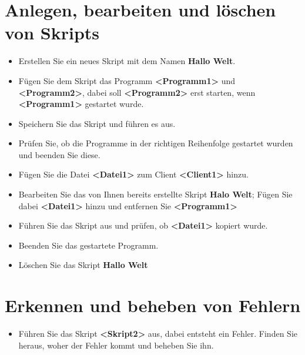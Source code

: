 \documentclass[accentcolor=tud1a,11pt]{tudexercise}
\begin{document}
\nutzerstudie
\section*{Anlegen, bearbeiten und löschen von Skripts}
\begin{itemize}
	\item Erstellen Sie ein neues Skript mit dem Namen \textbf{Hallo Welt}.
	\item Fügen Sie dem Skript das Programm \textbf{<Programm1>} und \textbf{<Programm2>}, dabei soll \textbf{<Programm2>} erst starten, wenn \textbf{<Programm1>} gestartet wurde.
	\item Speichern Sie das Skript und führen es aus.
	\item Prüfen Sie, ob die Programme in der richtigen Reihenfolge gestartet wurden und beenden Sie diese.
	\item Fügen Sie die Datei \textbf{<Datei1>} zum Client \textbf{<Client1>} hinzu.
	\item Bearbeiten Sie das von Ihnen bereits erstellte Skript \textbf{Halo Welt}; Fügen Sie dabei \textbf{<Datei1>} hinzu und entfernen Sie \textbf{<Programm1>}
	\item Führen Sie das Skript aus und prüfen, ob \textbf{<Datei1>} kopiert wurde.
	\item Beenden Sie das gestartete Programm.
	\item Löschen Sie das Skript \textbf{Hallo Welt}		
\end{itemize}
\section*{Erkennen und beheben von Fehlern}
\begin{itemize}
	\item Führen Sie das Skript \textbf{<Skript2>} aus, dabei entsteht ein Fehler. Finden Sie heraus, woher der Fehler kommt und beheben Sie ihn.
\end{itemize}
\end{document}
